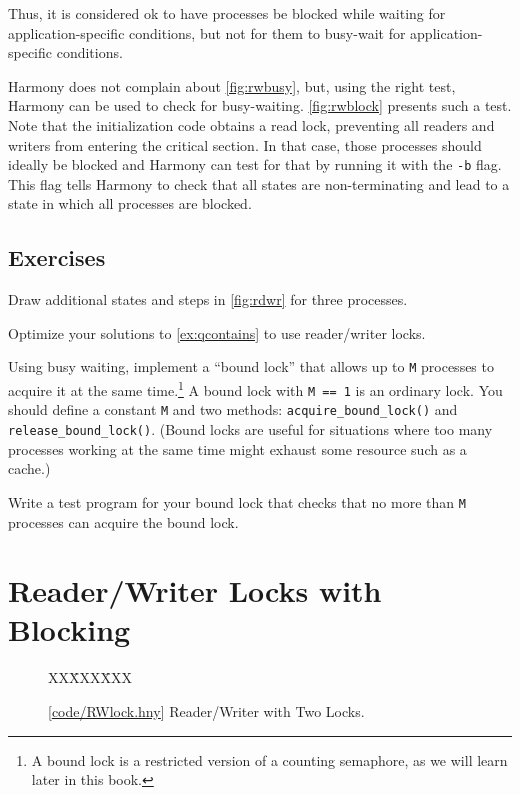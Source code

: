 \documentclass{report}
\newcommand{\harmonysource}[1]{
\begin{tabbing}
XX\=XXX\=XXX\kill
    
\end{tabbing}
}
\newcommand{\harmonylink}[1]{%
[\href{https://www.cs.cornell.edu/home/rvr/harmony/#1}{\underline{#1}}]%
}
\newenvironment{code}{
\tcolorbox
}{
\endtcolorbox
}
\begin{document}
Thus, it is considered ok to have processes be blocked while waiting
for application-specific conditions, but not for them to
busy-wait for application-specific conditions.

Harmony does not complain about \autoref{fig:rwbusy}, but, using
the right test, Harmony can be used to check for busy-waiting.
\autoref{fig:rwblock} presents such a test.
Note that the initialization code obtains a read lock, preventing
all readers and writers from entering the critical section.
In that case, those processes should ideally be blocked and Harmony
can test for that by running it with the \texttt{-b} flag.
This flag tells Harmony to check
that all states are non-terminating and lead to a state in which
all processes are blocked.

\section*{Exercises}
\begin{problems}
\item Draw additional states and steps in \autoref{fig:rdwr}
for three processes.
\item Optimize your solutions to \autoref{ex:qcontains} to use reader/writer locks.
\item \label{ex:boundlock} Using busy waiting, implement a ``bound lock'' that allows
up to \texttt{M} processes to acquire it at the same time.\footnote{A bound lock is a restricted version of a counting semaphore, as we will learn later in this book.}
A bound lock
with \texttt{M == 1} is an ordinary lock.
You should define a constant \texttt{M} and two methods:
\texttt{acquire\_bound\_lock()}
and \texttt{release\_bound\_lock()}.
(Bound locks are useful for situations where too many processes working
at the same time might exhaust some resource such as a cache.)
\item Write a test program for your bound lock
that checks that no more than \texttt{M} processes can acquire the
bound lock.
\end{problems}

\chapter{Reader/Writer Locks with Blocking}
\label{ch:rdwr2}

\begin{figure}
\begin{code}
\harmonysource{RWlock}
\end{code}
\caption{\harmonylink{code/RWlock.hny} Reader/Writer with Two Locks.}
\label{fig:rw2lock}
\end{figure}
\end{document}
